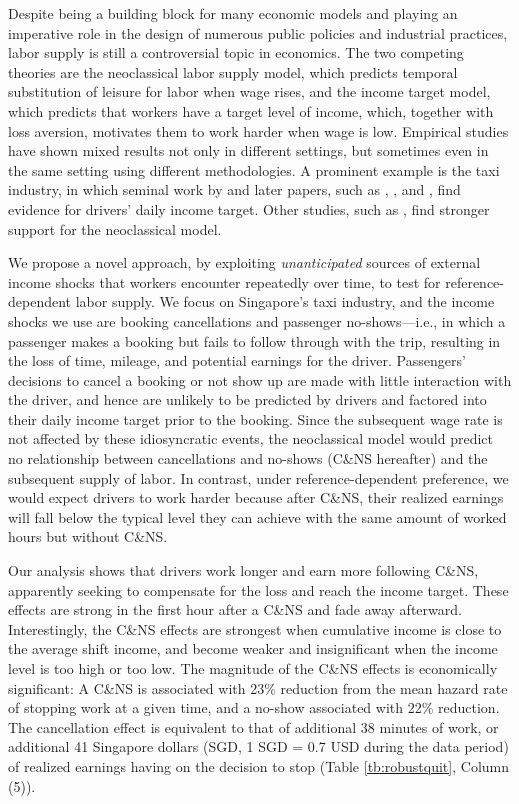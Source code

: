 \documentclass[reviewmode,AEJ]{AEA}
\begin{document}
\label{sec:intro}
Despite being a building block for many economic models and playing an imperative role in the 
design of numerous public policies and industrial practices, labor supply is still a controversial 
topic in economics. The two competing theories are the neoclassical labor supply model, which 
predicts temporal substitution of leisure for labor when wage rises, and the income target model, 
which predicts that workers have a target level of income, which, together with loss aversion, 
motivates them to work harder when wage is low. Empirical studies have shown mixed results not 
only in different settings, but sometimes even in the same setting using different methodologies.
A prominent example is the taxi industry, in which seminal work by \citet{camerer1997labor} and 
later papers, such as \citet{crawford2011new}, \citet{martin2017quit}, and \citet{thakral2018daily}, 
find evidence for drivers' daily income target. Other studies, such as 
\citet{farber2005tomorrow,farber2015you}, find stronger support for the neoclassical model.


We propose a novel approach, by exploiting \textit{unanticipated} sources of external 
income shocks that workers encounter repeatedly over time, to test for reference-dependent labor supply.
We focus on Singapore's taxi industry, and the income shocks we use are 
booking cancellations and passenger no-shows---i.e., in which a passenger makes a booking but fails 
to follow through with the trip, resulting in the loss of time, mileage, and potential earnings
for the driver. Passengers' decisions to cancel a booking or not show up are made with 
little interaction with the driver, and hence are unlikely to be predicted by drivers and factored 
into their daily income target prior to the booking. Since the subsequent wage rate is not affected 
by these idiosyncratic events, the neoclassical model would predict no relationship between cancellations 
and no-shows (C\&NS hereafter) and the subsequent supply of labor. In contrast, under reference-dependent 
preference, we would expect drivers to work harder because after C\&NS, their realized earnings will fall 
below the typical level they can achieve with the same amount of worked hours but without C\&NS. 

Our analysis shows that drivers work longer and earn more following 
C\&NS, apparently seeking to compensate for the loss and reach the income target. 
These effects are strong in the first hour after a 
C\&NS and fade away afterward. Interestingly, the C\&NS effects are strongest when cumulative income 
is close to the average shift income, and become weaker and insignificant when the income 
level is too high or too low. 
The magnitude of the C\&NS effects is economically significant: A C\&NS
is associated with 23\% reduction from the mean hazard rate of stopping work at a given time, and a no-show associated with 22\% reduction. 
The cancellation effect is equivalent to that of additional 38 minutes of work, or additional 41 Singapore dollars 
(SGD, 1 SGD = 0.7 USD during the data period) of realized earnings having on the decision to stop 
(Table \ref{tb:robustquit}, Column (5)). 
\end{document}
